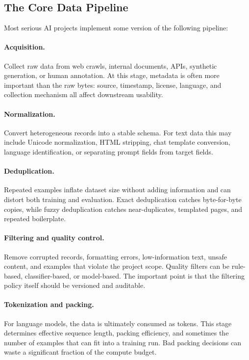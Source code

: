 \documentclass[class=article,crop=false]{standalone}
\begin{document}
\subsection{The Core Data Pipeline}
\label{sec:data:pipeline}

Most serious AI projects implement some version of the following pipeline:

\paragraph{Acquisition.}
Collect raw data from web crawls, internal documents, APIs, synthetic generation, or human annotation. At this stage, metadata is often more important than the raw bytes: source, timestamp, license, language, and collection mechanism all affect downstream usability.

\paragraph{Normalization.}
Convert heterogeneous records into a stable schema. For text data this may include Unicode normalization, HTML stripping, chat template conversion, language identification, or separating prompt fields from target fields.

\paragraph{Deduplication.}
Repeated examples inflate dataset size without adding information and can distort both training and evaluation. Exact deduplication catches byte-for-byte copies, while fuzzy deduplication catches near-duplicates, templated pages, and repeated boilerplate.

\paragraph{Filtering and quality control.}
Remove corrupted records, formatting errors, low-information text, unsafe content, and examples that violate the project scope. Quality filters can be rule-based, classifier-based, or model-based. The important point is that the filtering policy itself should be versioned and auditable.

\paragraph{Tokenization and packing.}
For language models, the data is ultimately consumed as tokens. This stage determines effective sequence length, packing efficiency, and sometimes the number of examples that can fit into a training run. Bad packing decisions can waste a significant fraction of the compute budget.
\end{document}
